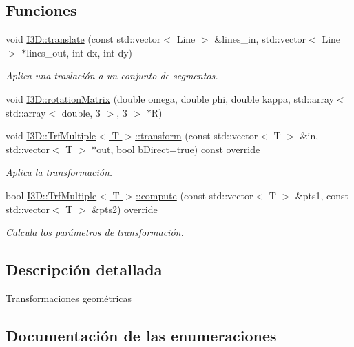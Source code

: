 \subsection*{Funciones}
\begin{DoxyCompactItemize}
\item 
void \hyperlink{group__trf_group_gade75ff2d290c3d31e95b624250c4c2a0}{I3\+D\+::translate} (const std\+::vector$<$ Line $>$ \&lines\+\_\+in, std\+::vector$<$ Line $>$ $\ast$lines\+\_\+out, int dx, int dy)
\begin{DoxyCompactList}\small\item\em Aplica una traslación a un conjunto de segmentos. \end{DoxyCompactList}\item 
void \hyperlink{group__trf_group_gaedbba4c545b8747f60628f382849b1fa}{I3\+D\+::rotation\+Matrix} (double omega, double phi, double kappa, std\+::array$<$ std\+::array$<$ double, 3 $>$, 3 $>$ $\ast$R)
\item 
void \hyperlink{group__trf_group_gad8eb1ca9e9b9c6e6d30f1f1b15dee818}{I3\+D\+::\+Trf\+Multiple$<$ T $>$\+::transform} (const std\+::vector$<$ T $>$ \&in, std\+::vector$<$ T $>$ $\ast$out, bool b\+Direct=true) const  override
\begin{DoxyCompactList}\small\item\em Aplica la transformación. \end{DoxyCompactList}\item 
bool \hyperlink{group__trf_group_ga30e6b58e89d4ad3657e1b6a74edc22cc}{I3\+D\+::\+Trf\+Multiple$<$ T $>$\+::compute} (const std\+::vector$<$ T $>$ \&pts1, const std\+::vector$<$ T $>$ \&pts2) override
\begin{DoxyCompactList}\small\item\em Calcula los parámetros de transformación. \end{DoxyCompactList}\end{DoxyCompactItemize}


\subsection{Descripción detallada}
Transformaciones geométricas 

\subsection{Documentación de las enumeraciones}
